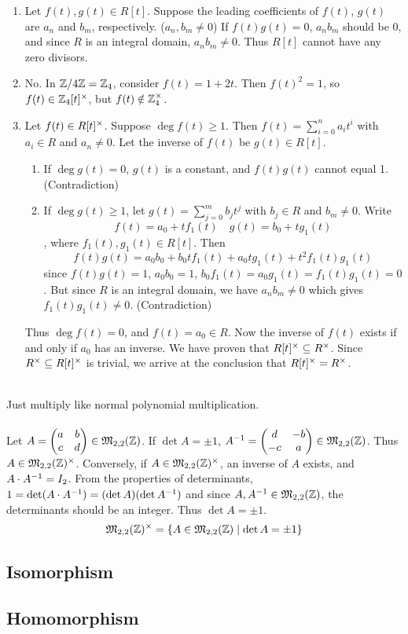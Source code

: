 \begin{enumerate}
	\item Let $f(t), g(t)\in R[t]$. Suppose the leading coefficients of $f(t)$, $g(t)$ are $a_n$ and $b_m$, respectively. ($a_n, b_m\neq 0$) If $f(t)g(t) = 0$, $a_nb_m$ should be 0, and since $R$ is an integral domain, $a_nb_m \neq 0$. Thus $R[t]$ cannot have any zero divisors.
	\item No. In $\mathbb{Z}/4\mathbb{Z} = \mathbb{Z}_4$, consider $f(t)=1+2t$. Then $f(t)^2 = 1$, so $f(t)\in \mathbb{Z}_4[t]^\times$, but $f(t)\notin \mathbb{Z}_4^\times$.
	\item Let $f(t) \in R[t]^\times$. Suppose $\deg f(t) \geq 1$. Then $f(t) = \sum_{i=0}^n a_i t^i$ with $a_i\in R$ and $a_n \neq 0$. Let the inverse of $f(t)$ be $g(t)\in R[t]$.
	\begin{enumerate}
		\item If $\deg g(t) = 0$, $g(t)$ is a constant, and $f(t)g(t)$ cannot equal 1. (Contradiction)
		\item If $\deg g(t) \geq 1$, let $g(t) = \sum_{j=0}^m b_j t^j$ with $b_j\in R$ and $b_m \neq 0$. Write 
		$$f(t) = a_0 + tf_1(t) \quad g(t) = b_0 + tg_1(t)$$
		, where $f_1(t), g_1(t)\in R[t]$. Then $$f(t)g(t) = a_0b_0 + b_0tf_1(t) + a_0tg_1(t) + t^2f_1(t)g_1(t)$$
		since $f(t)g(t) = 1$, $a_0b_0 = 1$, $b_0f_1(t) = a_0g_1(t) = f_1(t)g_1(t) = 0$. But since $R$ is an integral domain, we have $a_nb_m\neq 0$ which gives $f_1(t)g_1(t) \neq 0$. (Contradiction)
	\end{enumerate}
	Thus $\deg f(t) = 0$, and $f(t) = a_0 \in R$. Now the inverse of $f(t)$ exists if and only if $a_0$ has an inverse. We have proven that $R[t]^\times \subseteq R^\times$. Since $R^\times \subseteq R[t]^\times$ is trivial, we arrive at the conclusion that $R[t]^\times = R^\times$.
\end{enumerate}~
\\
 Just multiply like normal polynomial multiplication.\\
\\
 Let $A = \begin{pmatrix}
a & b \\ c & d
\end{pmatrix} \in \mathfrak{M}_{2, 2}(\mathbb{Z})$. If $\det A = \pm 1$, $A^{-1} = \begin{pmatrix}
d & -b \\ -c & a
\end{pmatrix} \in \mathfrak{M}_{2, 2}(\mathbb{Z})$. Thus $A\in \mathfrak{M}_{2, 2}(\mathbb{Z})^\times$. Conversely, if $A\in \mathfrak{M}_{2, 2}(\mathbb{Z})^\times$, an inverse of $A$ exists, and $A\cdot A^{-1} = I_2$. From the properties of determinants, $1 = \det (A\cdot A^{-1}) = (\det A)(\det A^{-1})$ and since $A, A^{-1} \in \mathfrak{M}_{2, 2}(\mathbb{Z})$, the determinants should be an integer. Thus $\det A = \pm 1$.
$$\mathfrak{M}_{2, 2}(\mathbb{Z})^\times = \{A\in \mathfrak{M}_{2, 2}(\mathbb{Z}) \mid \det A = \pm 1\}$$

\subsection{Isomorphism}

\subsection{Homomorphism}